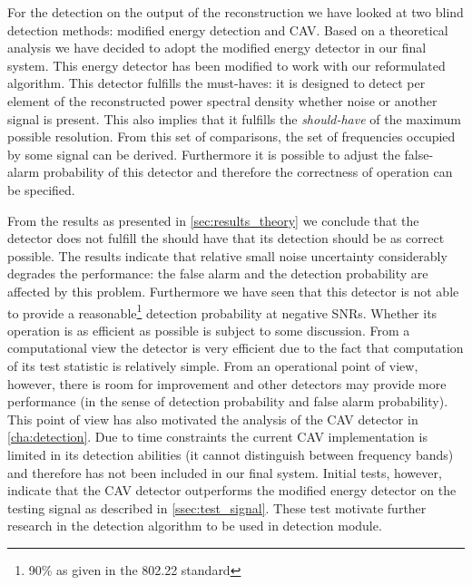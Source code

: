 \documentclass[a4paper, openany, oneside]{memoir}
\begin{document}
For the detection on the output of the reconstruction we have looked at two blind detection methods: modified energy detection and CAV. Based on  a theoretical analysis we have decided to adopt the modified energy detector in our final system. This energy detector has been modified to work with our reformulated algorithm. This detector fulfills the must-haves: it is designed to detect per element of the reconstructed power spectral
density whether noise or another signal is present. This also implies that it fulfills the \emph{should-have} of the maximum possible resolution.  From this set of comparisons, the set of frequencies occupied by some signal can be derived. Furthermore it is possible to adjust the false-alarm probability of this detector and therefore the correctness of operation can be specified. 

From the results as presented in \cref{sec:results_theory} we conclude that the detector does not fulfill the should have that its detection should be as correct possible. The results indicate that relative small noise uncertainty considerably degrades the  performance: the false alarm and the detection probability are affected by this problem. Furthermore we have seen that this detector is not able to provide a reasonable\footnote{90\% as given in the 802.22 standard} detection probability at negative SNRs. Whether its operation is as efficient as possible is subject  to some discussion. From a computational view the detector is very efficient due to the fact that computation of its test statistic is relatively simple. From an operational point of view, however, there is room for improvement and other detectors may provide more performance (in the sense of detection probability and false alarm probability). This point of view has also motivated the analysis of the CAV detector in \cref{cha:detection}. Due to time constraints the current CAV implementation is limited in its detection abilities (it cannot distinguish between frequency bands) and therefore has not been included in our final system. Initial tests, however, indicate that the CAV detector outperforms the modified energy detector on the testing signal as described in \cref{ssec:test_signal}. These test motivate further research in the detection algorithm to be used in detection module. 
\end{document}

